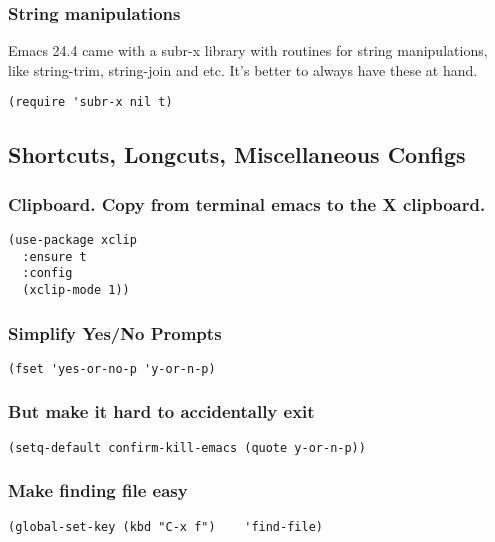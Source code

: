 \documentclass[11pt]{article}
\begin{document}
\subsubsection{String manipulations}
\label{sec:orgfb1f8cc}
Emacs 24.4 came with a subr-x library with routines for string manipulations, like string-trim, string-join and etc. It’s better to always have these at hand.

\begin{verbatim}
(require 'subr-x nil t)
\end{verbatim}

\subsection{Shortcuts, Longcuts, Miscellaneous Configs}
\label{sec:org9c4c5ec}
\subsubsection{Clipboard. Copy from terminal emacs to the X clipboard.}
\label{sec:org4439c6e}
\begin{verbatim}
(use-package xclip
  :ensure t
  :config
  (xclip-mode 1))

\end{verbatim}
\subsubsection{Simplify Yes/No Prompts}
\label{sec:org3d17a22}
\begin{verbatim}
(fset 'yes-or-no-p 'y-or-n-p)
\end{verbatim}

\subsubsection{But make it hard to accidentally exit}
\label{sec:orgb4b8433}
\begin{verbatim}
(setq-default confirm-kill-emacs (quote y-or-n-p))
\end{verbatim}

\subsubsection{Make finding file easy}
\label{sec:org0ad7532}
\begin{verbatim}
(global-set-key (kbd "C-x f")    'find-file)
\end{verbatim}
\end{document}
